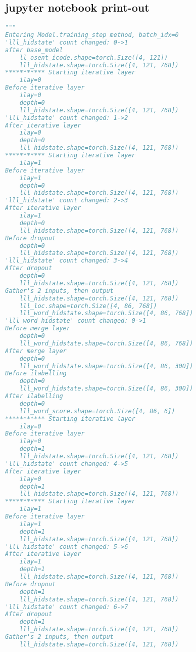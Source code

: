 \documentclass[12pt]{article}
\begin{document}
\subsection{jupyter notebook print-out}


\begin{lstlisting}[language=Python]
"""
Entering Model.training_step method, batch_idx=0
'lll_hidstate' count changed: 0->1
after base_model
    ll_osent_icode.shape=torch.Size([4, 121])
    lll_hidstate.shape=torch.Size([4, 121, 768])
*********** Starting iterative layer
    ilay=0
Before iterative layer
    ilay=0
    depth=0
    lll_hidstate.shape=torch.Size([4, 121, 768])
'lll_hidstate' count changed: 1->2
After iterative layer
    ilay=0
    depth=0
    lll_hidstate.shape=torch.Size([4, 121, 768])
*********** Starting iterative layer
    ilay=1
Before iterative layer
    ilay=1
    depth=0
    lll_hidstate.shape=torch.Size([4, 121, 768])
'lll_hidstate' count changed: 2->3
After iterative layer
    ilay=1
    depth=0
    lll_hidstate.shape=torch.Size([4, 121, 768])
Before dropout
    depth=0
    lll_hidstate.shape=torch.Size([4, 121, 768])
'lll_hidstate' count changed: 3->4
After dropout
    depth=0
    lll_hidstate.shape=torch.Size([4, 121, 768])
Gather's 2 inputs, then output
    lll_hidstate.shape=torch.Size([4, 121, 768])
    lll_loc.shape=torch.Size([4, 86, 768])
    lll_word_hidstate.shape=torch.Size([4, 86, 768])
'lll_word_hidstate' count changed: 0->1
Before merge layer
    depth=0
    lll_word_hidstate.shape=torch.Size([4, 86, 768])
After merge layer
    depth=0
    lll_word_hidstate.shape=torch.Size([4, 86, 300])
Before ilabelling
    depth=0
    lll_word_hidstate.shape=torch.Size([4, 86, 300])
After ilabelling
    depth=0
    lll_word_score.shape=torch.Size([4, 86, 6])
*********** Starting iterative layer
    ilay=0
Before iterative layer
    ilay=0
    depth=1
    lll_hidstate.shape=torch.Size([4, 121, 768])
'lll_hidstate' count changed: 4->5
After iterative layer
    ilay=0
    depth=1
    lll_hidstate.shape=torch.Size([4, 121, 768])
*********** Starting iterative layer
    ilay=1
Before iterative layer
    ilay=1
    depth=1
    lll_hidstate.shape=torch.Size([4, 121, 768])
'lll_hidstate' count changed: 5->6
After iterative layer
    ilay=1
    depth=1
    lll_hidstate.shape=torch.Size([4, 121, 768])
Before dropout
    depth=1
    lll_hidstate.shape=torch.Size([4, 121, 768])
'lll_hidstate' count changed: 6->7
After dropout
    depth=1
    lll_hidstate.shape=torch.Size([4, 121, 768])
Gather's 2 inputs, then output
    lll_hidstate.shape=torch.Size([4, 121, 768])

\end{lstlisting}
\end{document}
